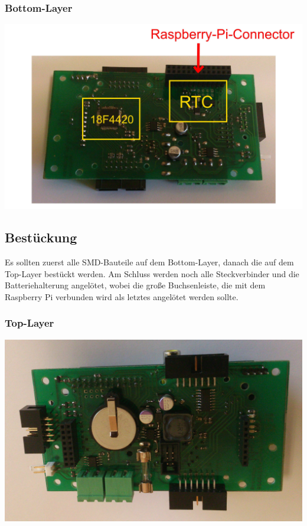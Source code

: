 \documentclass[a4paper,10pt]{article}
\begin{document}
\subsubsection{Bottom-Layer}

\includegraphics[width=\textwidth]{pointhiboard_overview_bottom}

\newpage
\subsection{Bestückung}

Es sollten zuerst alle SMD-Bauteile auf dem Bottom-Layer, danach die auf dem Top-Layer bestückt werden. Am Schluss werden noch alle Steckverbinder und die Batteriehalterung angelötet, wobei die große Buchsenleiste, die mit dem Raspberry Pi verbunden wird als letztes angelötet werden sollte. 

\subsubsection{Top-Layer}

\includegraphics[width=\textwidth]{pointhiboard_board_top} \\
\end{document}
